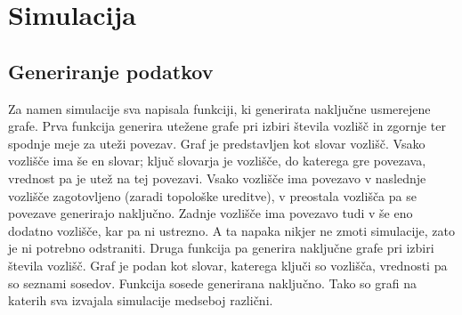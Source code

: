 \documentclass[a4paper, 9pt]{article}
\begin{document}
\section{Simulacija}

\subsection{Generiranje podatkov}
Za namen simulacije sva napisala funkciji, ki generirata naključne usmerejene grafe. Prva funkcija generira utežene grafe pri izbiri števila vozlišč in zgornje ter spodnje meje za uteži povezav. Graf je predstavljen kot slovar vozlišč. Vsako vozlišče ima še en slovar; ključ slovarja je vozlišče, do katerega gre povezava, vrednost pa je utež na tej povezavi. Vsako vozlišče ima povezavo v naslednje vozlišče zagotovljeno (zaradi topološke ureditve), v preostala vozlišča pa se povezave generirajo naključno. Zadnje vozlišče ima povezavo tudi v še eno dodatno vozlišče, kar pa ni ustrezno. A ta napaka nikjer ne zmoti simulacije, zato je ni potrebno odstraniti. Druga funkcija pa generira naključne grafe pri izbiri števila vozlišč. Graf je podan kot slovar, katerega ključi so vozlišča, vrednosti pa so seznami sosedov. Funkcija sosede generirana naključno. Tako so grafi na katerih sva izvajala simulacije medseboj različni.
\end{document}
